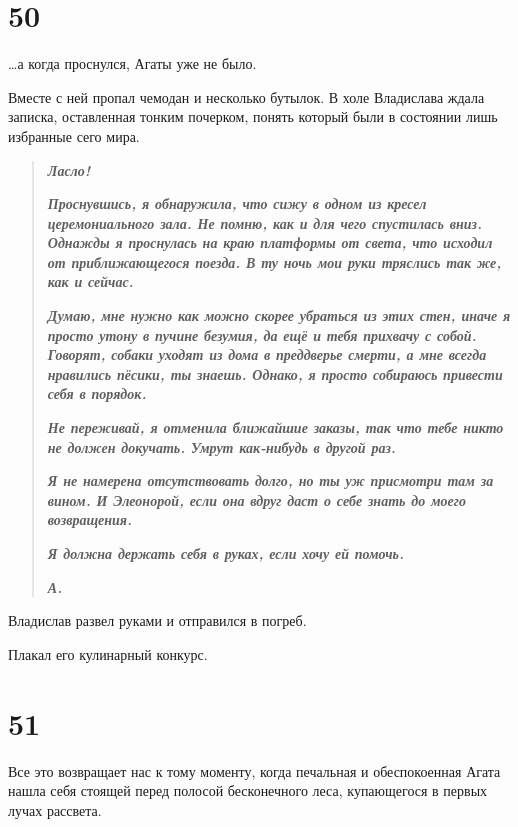 \documentclass[
  a5paperpaper,
  DIV=11,
  numbers=noendperiod]{scrreprt}
\begin{document}
\section*{50}\label{50}


\ldots а когда проснулся, Агаты уже не было.

Вместе с ней пропал чемодан и несколько бутылок. В холе Владислава ждала
записка, оставленная тонким почерком, понять который были в состоянии
лишь избранные сего мира.

\begin{quote}
\textbf{\emph{Ласло!}}

\textbf{\emph{Проснувшись, я обнаружила, что сижу в одном из кресел
церемониального зала. Не помню, как и для чего спустилась вниз. Однажды
я проснулась на краю платформы от света, что исходил от приближающегося
поезда. В ту ночь мои руки тряслись так же, как и сейчас.}}

\textbf{\emph{Думаю, мне нужно как можно скорее убраться из этих стен,
иначе я просто утону в пучине безумия, да ещё и тебя прихвачу с собой.
Говорят, собаки уходят из дома в преддверье смерти, а мне всегда
нравились пёсики, ты знаешь. Однако, я просто собираюсь привести себя в
порядок.}}

\textbf{\emph{Не переживай, я отменила ближайшие заказы, так что тебе
никто не должен докучать. Умрут как-нибудь в другой раз.}}

\textbf{\emph{Я не намерена отсутствовать долго, но ты уж присмотри там
за вином. И Элеонорой, если она вдруг даст о себе знать до моего
возвращения. }}

\textbf{\emph{Я должна держать себя в руках, если хочу ей помочь.}}

\textbf{\emph{А.}}
\end{quote}

Владислав развел руками и отправился в погреб.

Плакал его кулинарный конкурс.

\section*{51}\label{51}


Все это возвращает нас к тому моменту, когда печальная и обеспокоенная
Агата нашла себя стоящей перед полосой бесконечного леса, купающегося в
первых лучах рассвета.
\end{document}
